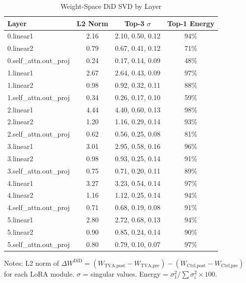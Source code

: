 \documentclass[12pt]{article}
\begin{document}
\begin{table}[H]
\centering
\caption{Weight-Space DiD SVD by Layer}
\label{tab:svd}
\begin{threeparttable}
\begin{tabular}{lccc}
\toprule
Layer & L2 Norm & Top-3 $\sigma$ & Top-1 Energy \\
\midrule
0.linear1 & 2.16 & 2.10, 0.50, 0.12 & 94\% \\
0.linear2 & 0.79 & 0.67, 0.41, 0.12 & 71\% \\
0.self\_attn.out\_proj & 0.24 & 0.17, 0.14, 0.09 & 48\% \\
\addlinespace
1.linear1 & 2.67 & 2.64, 0.43, 0.09 & 97\% \\
1.linear2 & 0.98 & 0.92, 0.32, 0.11 & 88\% \\
1.self\_attn.out\_proj & 0.34 & 0.26, 0.17, 0.10 & 59\% \\
\addlinespace
2.linear1 & 4.44 & 4.40, 0.60, 0.13 & 98\% \\
2.linear2 & 1.20 & 1.16, 0.29, 0.14 & 93\% \\
2.self\_attn.out\_proj & 0.62 & 0.56, 0.25, 0.08 & 81\% \\
\addlinespace
3.linear1 & 3.01 & 2.95, 0.58, 0.16 & 96\% \\
3.linear2 & 0.98 & 0.93, 0.25, 0.14 & 91\% \\
3.self\_attn.out\_proj & 0.75 & 0.71, 0.20, 0.11 & 89\% \\
\addlinespace
4.linear1 & 3.27 & 3.23, 0.54, 0.14 & 97\% \\
4.linear2 & 1.16 & 1.12, 0.25, 0.14 & 94\% \\
4.self\_attn.out\_proj & 0.71 & 0.68, 0.19, 0.08 & 91\% \\
\addlinespace
5.linear1 & 2.80 & 2.72, 0.68, 0.13 & 94\% \\
5.linear2 & 0.90 & 0.85, 0.24, 0.14 & 90\% \\
5.self\_attn.out\_proj & 0.80 & 0.79, 0.10, 0.07 & 97\% \\
\bottomrule
\end{tabular}
\begin{tablenotes}[flushleft]
\small
\item Notes: L2 norm of $\Delta W^{\text{DiD}} = (W_{\text{TVA,post}} - W_{\text{TVA,pre}}) - (W_{\text{Ctrl,post}} - W_{\text{Ctrl,pre}})$ for each LoRA module. $\sigma$ = singular values. Energy = $\sigma_1^2 / \sum \sigma_i^2 \times 100$.
\end{tablenotes}
\end{threeparttable}
\end{table}
\end{document}

